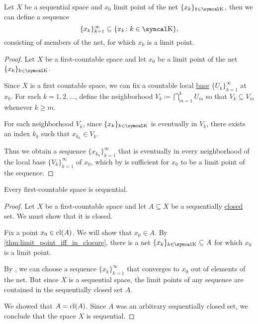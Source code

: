 \begin{Lemma}\label{thm:sequential_space_convergence}
  Let \( X \) be a sequential space and \( x_0 \) limit point of the net \( \{ x_k \}_{k \in \CK} \), then we can define a sequence
  \begin{equation*}
    \{ x_k \}_{k=1}^\infty \subseteq \{ x_k \colon k \in \CK \},
  \end{equation*}
  consisting of members of the net, for which \( x_0 \) is a limit point.
\end{Lemma}
\begin{proof}
  Let \( X \) be a first-countable space and let \( x_0 \) be a limit point of the net \( \{ x_k \}_{k \in \CK} \).

  Since \( X \) is a first countable space, we can fix a countable local \hyperref[def:topological_local_base]{base} \( \{ U_k \}_{k=1}^\infty \) at \( x_0 \). For each \( k = 1, 2, \ldots \), define the neighborhood \( V_k \coloneqq \bigcap_{m=1}^k U_m \) so that \( V_k \subseteq V_m \) whenever \( k \geq m \).

  For each neighborhood \( V_k \), since \( \{ x_k \}_{k \in \CK} \) is eventually in \( V_k \), there exists an index \( k_k \) such that \( x_{k_k} \in V_k \).

  Thus we obtain a sequence \( \{ x_{k_k} \}_{k=1}^\infty \) that is eventually in every neighborhood of the local base \( \{ V_k \}_{k=1}^\infty \) of \( x_0 \), which by  is sufficient for \( x_0 \) to be a limit point of the sequence.
\end{proof}

\begin{Proposition}\label{thm:first_countable_spaces_are_sequential}
  Every first-countable space is sequential.
\end{Proposition}
\begin{proof}
  Let \( X \) be a first-countable space and let \( A \subseteq X \) be a sequentially \hyperref[def:sequential_closure_operator]{closed} set. We must show that it is closed.

  Fix a point \( x_0 \in \operatorname{cl}(A) \). We will show that \( x_0 \in A \). By \cref{thm:limit_point_iff_in_closure}, there is a net \( \{ x_k \}_{k \in \CK} \subseteq A \) for which \( x_0 \) is a limit point.

  By , we can choose a sequence \( \{ x_k \}_{k=1}^\infty \) that converges to \( x_0 \) out of elements of the net. But since \( X \) is a sequential space, the limit points of any sequence are contained in the sequentially closed set \( A \).

  We showed that \( A = \operatorname{cl}(A) \). Since \( A \) was an arbitrary sequentially closed set, we conclude that the space \( X \) is sequential.
\end{proof}
